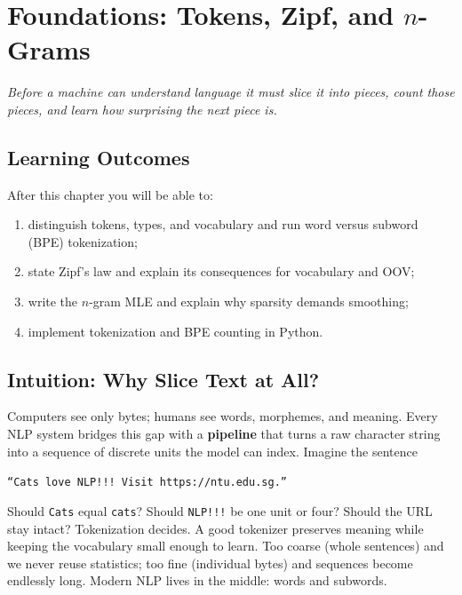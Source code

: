\chapter{\texorpdfstring{Foundations: Tokens, Zipf, and $n$-Grams}{Foundations: Tokens, Zipf, and n-Grams}}\label{ch:foundations}
\begin{center}\small\textit{Before a machine can understand language it must slice it into pieces, count those pieces, and learn how surprising the next piece is.}\end{center}

\noindent{}
\vspace{0.3em}
\section*{Learning Outcomes}
After this chapter you will be able to:
\begin{enumerate}[label=(L\arabic*)]
    \item distinguish tokens, types, and vocabulary and run word versus subword (BPE) tokenization;
    \item state Zipf's law and explain its consequences for vocabulary and OOV;
    \item write the $n$-gram MLE and explain why sparsity demands smoothing;
    \item implement tokenization and BPE counting in Python.
\end{enumerate}

\section{Intuition: Why Slice Text at All?}
Computers see only bytes; humans see words, morphemes, and meaning. Every NLP system bridges this gap with a \textbf{pipeline} that turns a raw character string into a sequence of discrete units the model can index. Imagine the sentence
\begin{center}\texttt{``Cats love NLP!!! Visit https://ntu.edu.sg.''}\end{center}
Should \texttt{Cats} equal \texttt{cats}? Should \texttt{NLP!!!} be one unit or four? Should the URL stay intact? Tokenization decides. A good tokenizer preserves meaning while keeping the vocabulary small enough to learn. Too coarse (whole sentences) and we never reuse statistics; too fine (individual bytes) and sequences become endlessly long. Modern NLP lives in the middle: words and subwords.

